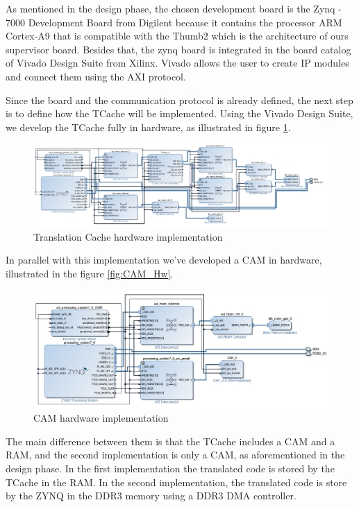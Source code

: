 As mentioned in the design phase, the chosen development board is the Zynq - 7000 Development Board from Digilent because it contains the processor ARM Cortex-A9 that is compatible with the Thumb2 which is the architecture of ours supervisor board. Besides that, the zynq board is integrated in the board catalog of Vivado Design Suite from Xilinx. Vivado allows the user to create IP modules and connect them using the AXI protocol.

Since the board and the communication protocol is already defined, the next step is to define how the TCache will be implemented. Using the Vivado Design Suite, we develop the TCache fully in hardware, as illustrated in figure \ref{fig:HwError1}. 

\begin{figure} [h!]
	\centering
	\includegraphics[scale = 0.45]{images/HwError1.png}
	\caption{Translation Cache hardware implementation}
	\label{fig:HwError1}
\end{figure}

In parallel with this implementation we've developed a CAM in hardware, illustrated in the figure \ref{fig:CAM_Hw}.

\begin{figure} [H]
	\centering
	\includegraphics[scale = 0.45]{images/CAM_Hw.png}
	\caption{CAM hardware implementation}
	\label{fig:CAM_HwImp}
\end{figure}

The main difference between them is that the TCache includes a CAM and a RAM, and the second implementation is only a CAM, as aforementioned in the design phase.
In the first implementation the translated code is stored by the TCache in the RAM. In the second implementation, the translated code is store by the ZYNQ in the DDR3 memory using a DDR3 DMA controller.

